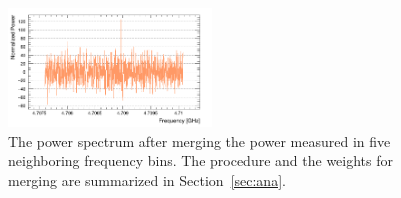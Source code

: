 \begin{figure}[htbp]                                                                                                  
    \centering                                                                                                                       
    \includegraphics[width=0.48\textwidth]{figures/Power_GrandSpectrum_FaxionRun_AllSteps_Rescan_Merged_5bin_SG4_W201_LqWeight.png}
    \caption{The power spectrum after merging the power measured in five 
neighboring frequency bins. The procedure and the weights for merging 
are summarized in Section~\ref{sec:ana}.}                
\label{fig:faxionmerge}    
\end{figure}                       

   
